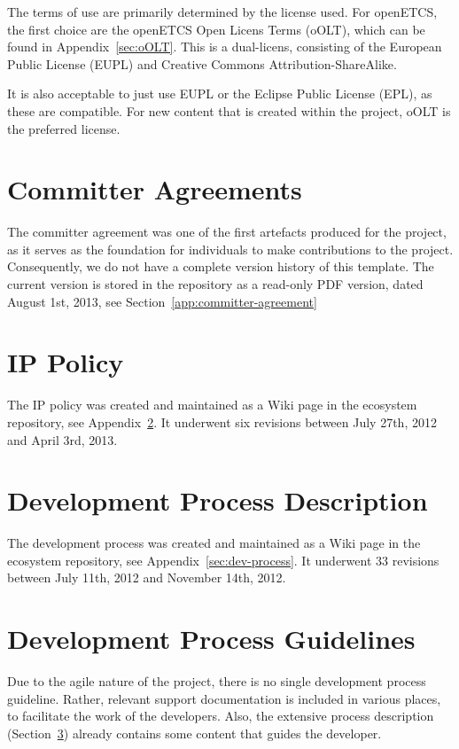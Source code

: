 \documentclass{template/openetcs_report}
\begin{document}
The terms of use are primarily determined by the license used.  For openETCS, the first choice are the openETCS Open Licens Terms (oOLT), which can be found in Appendix~\ref{sec:oOLT}. This is a dual-licens, consisting of the European Public License (EUPL) and Creative Commons Attribution-ShareAlike.

It is also acceptable to just use EUPL or the Eclipse Public License (EPL), as these are compatible. For new content that is created within the project, oOLT is the preferred license.

\section{Committer Agreements}
\label{sec:committer-agreements}

The committer agreement was one of the first artefacts produced for the project, as it serves as the foundation for individuals to make contributions to the project.  Consequently, we do not have a complete version history of this template.  The current version is stored in the repository as a read-only PDF version, dated August 1st, 2013, see Section~\ref{app:committer-agreement}

\section{IP Policy}
\label{sec:ip-policy}

The IP policy was created and maintained as a Wiki page in the ecosystem repository, see Appendix~\ref{sec:ip-policy}.  It underwent six revisions between July 27th, 2012 and April 3rd, 2013.

\section{Development Process Description}
\label{sec:dev-process-description}

The development process was created and maintained as a Wiki page in the ecosystem repository, see Appendix~\ref{sec:dev-process}.  It underwent 33 revisions between July 11th, 2012 and November 14th, 2012.

\section{Development Process Guidelines}
\label{dev-process-guide}

Due to the agile nature of the project, there is no single development process guideline.  Rather, relevant support documentation is included in various places, to facilitate the work of the developers.  Also, the extensive process description (Section~\ref{sec:dev-process-description}) already contains some content that guides the developer.
\end{document}
